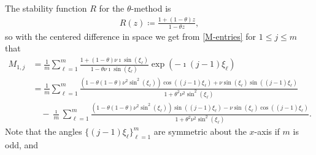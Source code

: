 \documentclass[a4paper]{article}
\begin{document}
%
The stability function $R$ for the $\theta$-method \cite[Chapter IV.3]{hairerwanner} is
\begin{align}\label{R}
    R(z)  \coloneqq \frac{1+(1-\theta)z}{1-\theta z},
\end{align}
so with the centered difference in space we get from \eqref{M-entries} for $1\le j\le m$ that
\begin{equation}\label{matrix_entries}
\begin{split}
	M_{1,j} &= \frac{1}{m} \sum_{\ell=1}^m \frac{1+(1-\theta)\nu \imath\sin(\xi_\ell)}
		{1-\theta\nu \imath\sin(\xi_\ell)}\exp\left(-\imath(j-1)\xi_\ell\right) \\
		&= \frac{1}{m} \sum_{\ell=1}^{m} \frac{\left(1-\theta(1-\theta)\nu^2\sin^2(\xi_\ell)\right)
		\cos((j-1)\xi_\ell) + \nu \sin(\xi_\ell)\sin((j-1)\xi_\ell)}{1+\theta^2\nu^2 \sin^2(\xi_\ell)} \\
		&\quad - \frac{\imath}{m} \sum_{\ell=1}^{m} \frac{\left(1-\theta(1-\theta)\nu^2\sin^2(\xi_\ell)
		\right)\sin((j-1)\xi_\ell) - \nu \sin(\xi_\ell)\cos((j-1)\xi_\ell)}
		{1+\theta^2\nu^2 \sin^2(\xi_\ell)}.
\end{split}
\end{equation}
Note that the angles $\{(j-1)\xi_\ell\}_{\ell=1}^m$ are symmetric about the $x$-axis if $m$ is odd, and
\end{document}

